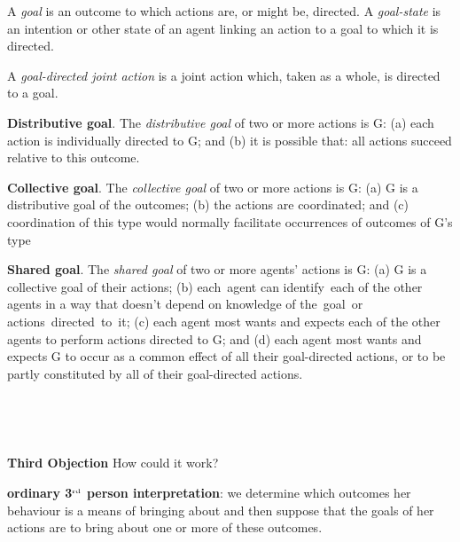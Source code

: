 \documentclass[11pt]{extarticle}
\begin{document}
\begin{multicols}{3}
A \emph{goal} is an outcome to which actions are, or might be, directed.  A \emph{goal-state} is an intention or other state of an agent linking an action to a goal to which it is directed.

A \emph{goal-directed joint action} is a joint action which, taken as a whole, is directed to a goal.

\textbf{Distributive goal}.  The \emph{distributive goal} of two or more actions is G: (a) each action is individually directed to G; and (b) it is possible that: all actions succeed relative to this outcome.

\textbf{Collective goal}.  The \emph{collective goal} of two or more actions is G:
(a) G is a distributive goal of the outcomes;
(b) the actions are coordinated; and 
(c) coordination of this type would normally  facilitate occurrences of outcomes of G's type


\textbf{Shared goal}.  The \emph{shared goal} of two or more agents' actions is G: (a) G is a collective goal of their actions; 
(b) each agent can identify each of the other agents in a way that doesn't depend on knowledge of the goal or	 actions directed to it;
(c) each agent most wants and expects each of the other agents to perform actions directed to G; and 
(d) each agent most wants and expects G to occur as a common effect of all their goal-directed actions, or to be partly constituted by all of their goal-directed actions.


\ 

\ %

{\Large
\textbf{Third Objection}
How could it work?
}

\textbf{ordinary 3$^{\textrm{\tiny rd}}$ person interpretation}: we determine which outcomes her behaviour is a means of bringing about and then suppose that the goals of her actions are to bring about one or more of these outcomes.


\end{multicols}
\end{document}

